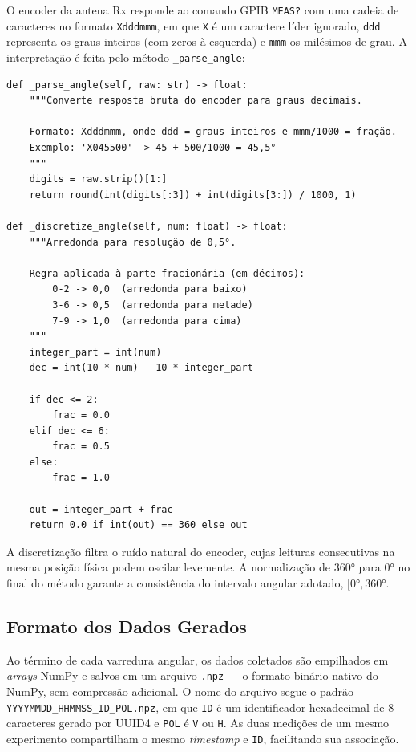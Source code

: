 \documentclass[12pt, a4paper]{article}
\begin{document}
O encoder da antena Rx responde ao comando GPIB \texttt{MEAS?} com uma cadeia de caracteres no formato \texttt{Xdddmmm}, em que \texttt{X} é um caractere líder ignorado, \texttt{ddd} representa os graus inteiros (com zeros à esquerda) e \texttt{mmm} os milésimos de grau. A interpretação é feita pelo método \texttt{\_parse\_angle}:

\begin{lstlisting}[style=python, caption={Interpretação da resposta bruta do encoder e discretização angular (\texttt{drivers/system.py}).}]
def _parse_angle(self, raw: str) -> float:
    """Converte resposta bruta do encoder para graus decimais.

    Formato: Xdddmmm, onde ddd = graus inteiros e mmm/1000 = fração.
    Exemplo: 'X045500' -> 45 + 500/1000 = 45,5°
    """
    digits = raw.strip()[1:]
    return round(int(digits[:3]) + int(digits[3:]) / 1000, 1)

def _discretize_angle(self, num: float) -> float:
    """Arredonda para resolução de 0,5°.

    Regra aplicada à parte fracionária (em décimos):
        0-2 -> 0,0  (arredonda para baixo)
        3-6 -> 0,5  (arredonda para metade)
        7-9 -> 1,0  (arredonda para cima)
    """
    integer_part = int(num)
    dec = int(10 * num) - 10 * integer_part

    if dec <= 2:
        frac = 0.0
    elif dec <= 6:
        frac = 0.5
    else:
        frac = 1.0

    out = integer_part + frac
    return 0.0 if int(out) == 360 else out
\end{lstlisting}

A discretização filtra o ruído natural do encoder, cujas leituras consecutivas na mesma posição física podem oscilar levemente. A normalização de 360° para 0° no final do método garante a consistência do intervalo angular adotado, $[0°, 360°$.

\subsection{Formato dos Dados Gerados}

Ao término de cada varredura angular, os dados coletados são empilhados em \textit{arrays} NumPy e salvos em um arquivo \texttt{.npz} --- o formato binário nativo do NumPy, sem compressão adicional. O nome do arquivo segue o padrão \texttt{YYYYMMDD\_HHMMSS\_\textlangle ID\textrangle\_\textlangle POL\textrangle.npz}, em que \texttt{ID} é um identificador hexadecimal de 8 caracteres gerado por UUID4 e \texttt{POL} é \texttt{V} ou \texttt{H}. As duas medições de um mesmo experimento compartilham o mesmo \textit{timestamp} e \texttt{ID}, facilitando sua associação.
\end{document}

